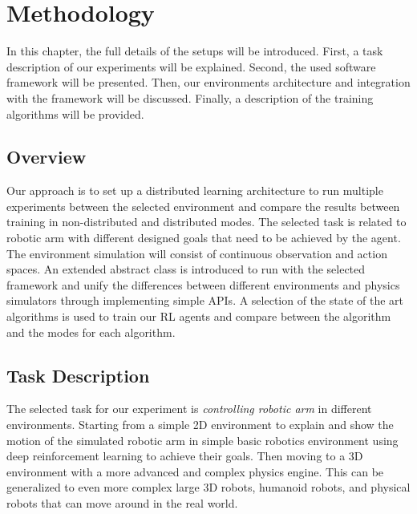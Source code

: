 
\chapter{Methodology}\label{chapter:methodology}

In this chapter, the full details of the setups will be introduced. First, a task description of our experiments will be explained. Second, the used software framework will be presented. Then, our environments architecture and integration with the framework will be discussed. Finally, a description of the training algorithms will be provided.

\section{Overview}

Our approach is to set up a distributed learning architecture to run multiple experiments between the selected environment and compare the results between training in non-distributed and distributed modes. The selected task is related to robotic arm with different designed goals that need to be achieved by the agent. The environment simulation will consist of continuous observation and action spaces. An extended abstract class is introduced to run with the selected framework and unify the differences between different environments and physics simulators through implementing simple APIs. A selection of the state of the art algorithms is used to train our RL agents and compare between the algorithm and the modes for each algorithm.

\section{Task Description}

The selected task for our experiment is \textit{controlling robotic arm} in different environments. Starting from a simple 2D environment to explain and show the motion of the simulated robotic arm in simple basic robotics environment using deep reinforcement learning to achieve their goals. Then moving to a 3D environment with a more advanced and complex physics engine. This can be generalized to even more complex large 3D robots, humanoid robots, and physical robots that can move around in the real world.


